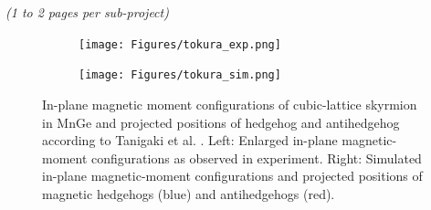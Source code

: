 \documentclass [a4paper, 12pt]{article}
\begin{document}


\textit{(1 to 2 pages per sub-project)}

\begin{figure}[h]
	\centering
	\begin{subfigure}{.5\textwidth}
		  \centering
		  \texttt{[image: Figures/tokura\_exp.png]}
		  \label{fig:sub1}
	\end{subfigure}%
	\begin{subfigure}{.5\textwidth}
		  \centering
		  \texttt{[image: Figures/tokura\_sim.png]}
                  \label{fig:sub2}
	\end{subfigure}
	\caption{In-plane magnetic moment configurations of cubic-lattice skyrmion 
		in MnGe and projected positions of hedgehog and antihedgehog according to
	        Tanigaki et al. \cite{tanigaki_real-space_2015}.
		Left: Enlarged in-plane magnetic-moment configurations as observed in experiment.
		Right: Simulated in-plane magnetic-moment configurations and projected
		positions of magnetic hedgehogs (blue) and antihedgehogs (red).}
		
	\label{fig:tokura_results}
\end{figure}
\end{document}
